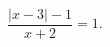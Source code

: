 \begin{ex}[type=equation]
	\begin{condition}
		$\dfrac{\big|x - 3\big| - 1}{x + 2} = 1.$
	\end{condition}
\end{ex}
